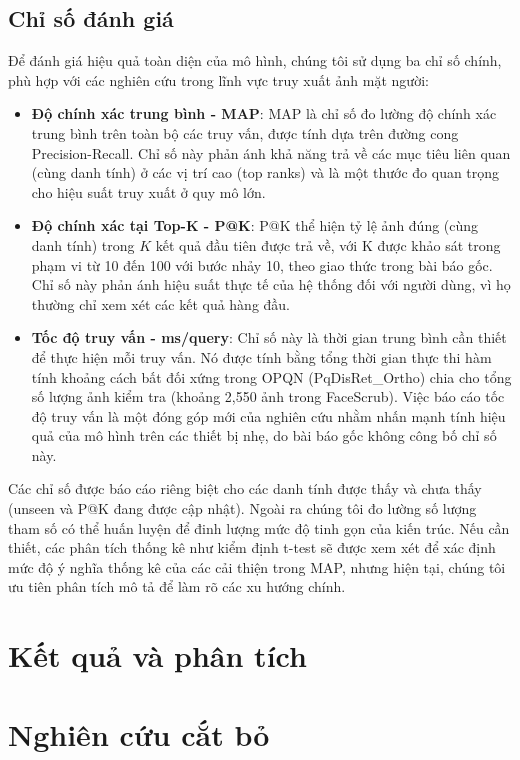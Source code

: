 \subsection{Chỉ số đánh giá}
Để đánh giá hiệu quả toàn diện của mô hình, chúng tôi sử dụng ba chỉ số chính, phù hợp với các nghiên cứu trong lĩnh vực truy xuất ảnh mặt người:
\begin{itemize}
    \item \textbf{Độ chính xác trung bình - MAP}: MAP là chỉ số đo lường độ chính xác trung bình trên toàn bộ các truy vấn, được tính dựa trên đường cong Precision-Recall. Chỉ số này phản ánh khả năng trả về các mục tiêu liên quan (cùng danh tính) ở các vị trí cao (top ranks) và là một thước đo quan trọng cho hiệu suất truy xuất ở quy mô lớn.
    \item \textbf{Độ chính xác tại Top-K - P@K}: P@K thể hiện tỷ lệ ảnh đúng (cùng danh tính) trong $K$ kết quả đầu tiên được trả về, với K được khảo sát trong phạm vi từ 10 đến 100 với bước nhảy 10, theo giao thức trong bài báo gốc. Chỉ số này phản ánh hiệu suất thực tế của hệ thống đối với người dùng, vì họ thường chỉ xem xét các kết quả hàng đầu.
    \item \textbf{Tốc độ truy vấn - ms/query}: Chỉ số này là thời gian trung bình cần thiết để thực hiện mỗi truy vấn. Nó được tính bằng tổng thời gian thực thi hàm tính khoảng cách bất đối xứng trong OPQN (PqDisRet\_Ortho) chia cho tổng số lượng ảnh kiểm tra (khoảng 2,550 ảnh trong FaceScrub). Việc báo cáo tốc độ truy vấn là một đóng góp mới của nghiên cứu nhằm nhấn mạnh tính hiệu quả của mô hình trên các thiết bị nhẹ, do bài báo gốc không công bố chỉ số này.
\end{itemize}

Các chỉ số được báo cáo riêng biệt cho các danh tính được thấy và chưa thấy (unseen và P@K đang được cập nhật). Ngoài ra chúng tôi đo lường số lượng tham số có thể huấn luyện để đinh lượng mức độ tinh gọn của kiến trúc. Nếu cần thiết, các phân tích thống kê như kiểm định t-test sẽ được xem xét để xác định mức độ ý nghĩa thống kê của các cải thiện trong MAP, nhưng hiện tại, chúng tôi ưu tiên phân tích mô tả để làm rõ các xu hướng chính.

\section {Kết quả và phân tích}

\section {Nghiên cứu cắt bỏ}